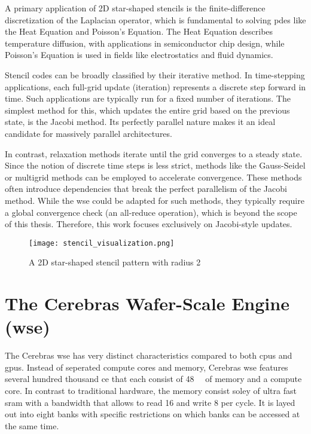 A primary application of 2D star-shaped stencils is the finite-difference discretization of the Laplacian operator, which is fundamental to solving \acp{pde} like the Heat Equation and Poisson's Equation. The Heat Equation describes temperature diffusion, with applications in semiconductor chip design, while Poisson's Equation is used in fields like electrostatics and fluid dynamics.

Stencil codes can be broadly classified by their iterative method. In time-stepping applications, each full-grid update (iteration) represents a discrete step forward in time. Such applications are typically run for a fixed number of iterations. The simplest method for this, which updates the entire grid based on the previous state, is the Jacobi method. Its perfectly parallel nature makes it an ideal candidate for massively parallel architectures.

In contrast, relaxation methods iterate until the grid converges to a steady state. Since the notion of discrete time steps is less strict, methods like the Gauss-Seidel or multigrid methods can be employed to accelerate convergence. These methods often introduce dependencies that break the perfect parallelism of the Jacobi method. While the \ac{wse} could be adapted for such methods, they typically require a global convergence check (an all-reduce operation), which is beyond the scope of this thesis. Therefore, this work focuses exclusively on Jacobi-style updates.

\begin{figure}[h]
    \centering
    \texttt{[image: stencil\_visualization.png]}
    \caption{A 2D star-shaped stencil pattern with radius 2}
    \label{fig:stencil_visualization}
\end{figure}

\section{The Cerebras Wafer-Scale Engine (\ac{wse})}
The Cerebras \ac{wse} has very distinct characteristics compared to both \acp{cpu} and \acp{gpu}.
Instead of seperated compute cores and memory, Cerebras \ac{wse} features several hundred thousand \ac{ce} that each consist of \qty{48}{\kilo\byte} of memory and a compute core. In contrast to traditional hardware, the memory consist soley of ultra fast \ac{sram} with a bandwidth that allows to read \qty{16}{\byte} and write \qty{8}{\byte} per cycle. It is layed out into eight banks with specific restrictions on which banks can be accessed at the same time.


